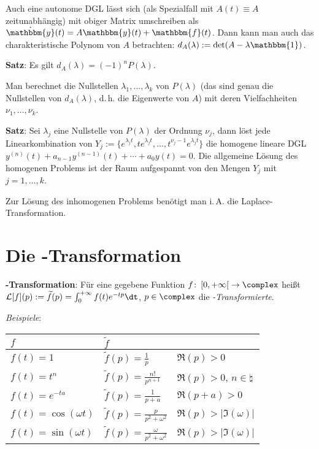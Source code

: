 Auch eine autonome DGL lässt sich (als Spezialfall mit $A(t) \equiv A$
zeitunabhängig) mit obiger Matrix umschreiben als
$\dot{\mathbbm{y}}(t) = A \mathbbm{y}(t) + \mathbbm{f}(t)$.
Dann kann man auch das charakteristische Polynom von $A$ betrachten:
$d_A(\lambda) := \det(A - \lambda \mathbbm{1})$.

\textbf{Satz}:
Es gilt $d_A(\lambda) = (-1)^n P(\lambda)$.

Man berechnet die Nullstellen $\lambda_1, \dotsc, \lambda_k$
von $P(\lambda)$ (das sind genau die Nullstellen
von $d_A(\lambda)$, d.\,h. die Eigenwerte von $A$)
mit deren Vielfachheiten $\nu_1, \dotsc, \nu_k$.

\textbf{Satz}:
Sei $\lambda_j$ eine Nullstelle von $P(\lambda)$ der Ordnung $\nu_j$,
dann löst jede Linearkombination von
$Y_j := \{e^{\lambda_j t}, t e^{\lambda_j t}, \dotsc,
t^{\nu_j - 1} e^{\lambda_j t}\}$ die homogene lineare DGL \\
$y^{(n)}(t) + a_{n-1} y^{(n-1)}(t) + \dotsb + a_0 y(t) = 0$.
Die allgemeine Lösung des homogenen Problems ist der Raum aufgespannt von
den Mengen $Y_j$ mit $j = 1, \dotsc, k$.

Zur Lösung des inhomogenen Problems benötigt man i.\,A.
die Laplace-Transformation.

\pagebreak

\section{%
    Die -Transformation%
}

\textbf{-Transformation}:
Für eine gegebene Funktion
$f\colon \left[0, +\infty\right[ \rightarrow \complex$ heißt \\
$\L[f](p) := \widetilde{f}(p) = \int_0^{+\infty} f(t) e^{-tp} \dt$,
$p \in \complex$ die \emph{-Transformierte}.

\emph{Beispiele}: \\
\begin{tabular}{l|ll}
    $f$ & $\widetilde{f}$ & \\\hline
    $f(t) = 1$ & $\widetilde{f}(p) = \frac{1}{p}$ & $\Re(p) > 0$ \\
    $f(t) = t^n$ & $\widetilde{f}(p) = \frac{n!}{p^{n+1}}$ &
    $\Re(p) > 0$, $n \in \natural$ \\
    $f(t) = e^{-ta}$ & $\widetilde{f}(p) = \frac{1}{p+a}$ & $\Re(p + a) > 0$ \\
    $f(t) = \cos(\omega t)$ &
    $\widetilde{f}(p) = \frac{p}{p^2 + \omega^2}$ &
    $\Re(p) > |\Im(\omega)|$ \\
    $f(t) = \sin(\omega t)$ &
    $\widetilde{f}(p) = \frac{\omega}{p^2 + \omega^2}$ &
    $\Re(p) > |\Im(\omega)|$ \\
\end{tabular}


